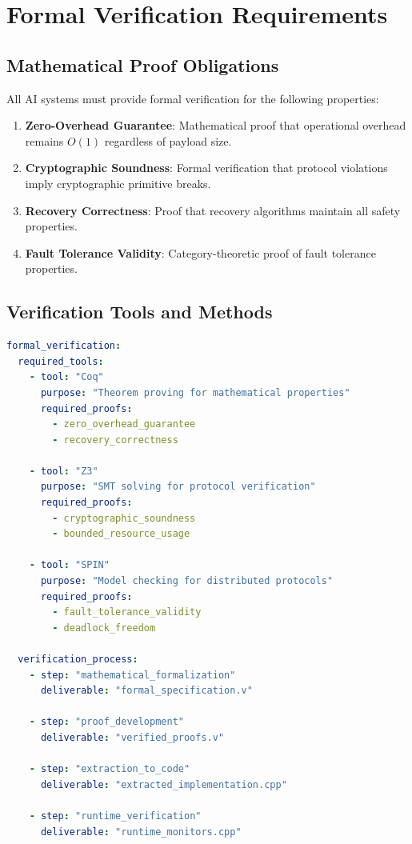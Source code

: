 \documentclass[12pt,a4paper]{article}
\begin{document}
\section{Formal Verification Requirements}

\subsection{Mathematical Proof Obligations}

All AI systems must provide formal verification for the following properties:

\begin{enumerate}
    \item \textbf{Zero-Overhead Guarantee}: Mathematical proof that operational overhead remains $O(1)$ regardless of payload size.
    \item \textbf{Cryptographic Soundness}: Formal verification that protocol violations imply cryptographic primitive breaks.
    \item \textbf{Recovery Correctness}: Proof that recovery algorithms maintain all safety properties.
    \item \textbf{Fault Tolerance Validity}: Category-theoretic proof of fault tolerance properties.
\end{enumerate}

\subsection{Verification Tools and Methods}

\begin{lstlisting}[language=yaml, caption=Formal Verification Configuration]
formal_verification:
  required_tools:
    - tool: "Coq"
      purpose: "Theorem proving for mathematical properties"
      required_proofs:
        - zero_overhead_guarantee
        - recovery_correctness
        
    - tool: "Z3"
      purpose: "SMT solving for protocol verification"
      required_proofs:
        - cryptographic_soundness
        - bounded_resource_usage
        
    - tool: "SPIN"
      purpose: "Model checking for distributed protocols"
      required_proofs:
        - fault_tolerance_validity
        - deadlock_freedom
        
  verification_process:
    - step: "mathematical_formalization"
      deliverable: "formal_specification.v"
      
    - step: "proof_development"
      deliverable: "verified_proofs.v"
      
    - step: "extraction_to_code"
      deliverable: "extracted_implementation.cpp"
      
    - step: "runtime_verification"
      deliverable: "runtime_monitors.cpp"
\end{lstlisting}
\end{document}
